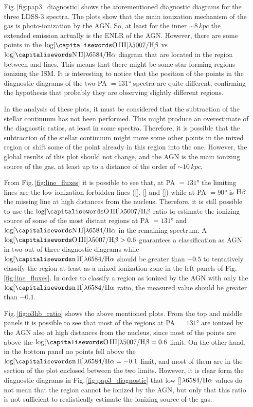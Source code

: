 \documentclass[../main.tex]{subfiles}
\begin{document}
Fig.\,\ref{fig:pap3_diagnostic} shows the aforementioned diagnostic diagrams for the three LDSS-3 spectra.
The plots show that the main ionization mechanism of the gas is photo-ionization by the AGN.
So, at least for the inner $\sim 8\,\si{kpc}$ the extended emission actually is the ENLR of the AGN.
However, there are some points in the $\log [\rm \ion{O}{III}]\lambda5007/\Hb$ vs $\log [\rm \ion{N}{II}]\lambda6584/\Ha$ diagram that are located in the region between \citet{Kewley01} and \citet{Kauffmann03} lines.
This means that there might be some star forming regions ionizing the ISM.
It is interesting to notice that the position of the points in the diagnostic diagrams of the two PA $=\ang{131}$ spectra are quite different, confirming the hypothesis that probably they are observing slightly different regions. 

In the analysis of these plots, it must be considered that the subtraction of the stellar continuum has not been performed.
This might produce an overestimate of the diagnostic ratios, at least in some spectra.
Therefore, it is possible that the subtraction of the stellar continuum might move some other points in the mixed region or shift some of the point already in this region into the  one.
However, the global results of this plot should not change, and the AGN is the main ionizing source of the gas, at least up to a distance of the order of $\sim 10\,\si{kpc}$.

From Fig.\,\ref{fig:line_fluxes} it is possible to see that, at PA $=\ang{131}$ the limiting lines are the low ionization forbidden lines ([], [] and []) while at PA $=\ang{90}$ is $\rm H\beta$ the missing line at high distances from the nucleus.
Therefore, it is still possible to use the $\log[\rm \ion{O}{III}]\lambda5007/\Hb$ ratio to estimate the ionizing source of some of the most distant regions at PA $=\ang{131}$ and  $\log[\rm \ion{N}{II}]\lambda6584/\Ha$ in the remaining spectrum.
A $\log[\rm \ion{O}{III}]\lambda5007/\Hb>0.6$
guarantees a classification as AGN in two out of three diagnostic diagrams while $\log[\rm \ion{n}{II}]\lambda6584/\Ha$ should be greater than $-0.5$ to tentatively classify the region at least as a mixed ionization zone in the left panels of Fig.\,\ref{fig:line_fluxes}.
In order to classify a region as ionized by the AGN with only the $\log[\rm \ion{n}{II}]\lambda6584/\Ha$ ratio, the measured value should be greater than $-0.1$.

Fig.\,\ref{fig:o3hb_ratio} shows the above mentioned plots.
From the top and middle panels it is possible to see that most of the regions at PA $=\ang{131}$ are ionized by the AGN also at high distances from the nucleus, since most of the points are above the $\log[\rm \ion{O}{III}]\lambda5007/\Hb=0.6$ limit.
On the other hand, in the bottom panel no points fell above the $\log[\rm \ion{n}{II}]\lambda6584/\Ha=-0.1$ limit, and most of them are in the section of the plot enclosed between the two limits.
However, it is clear form the diagnostic diagrams in Fig.\,\ref{fig:pap3_diagnostic} that low []$\lambda6584/\rm H\alpha$ values do not mean that the region cannot be ionized by the AGN, but only that this ratio is not sufficient to realistically estimate the ionizing source of the gas.
\end{document}
